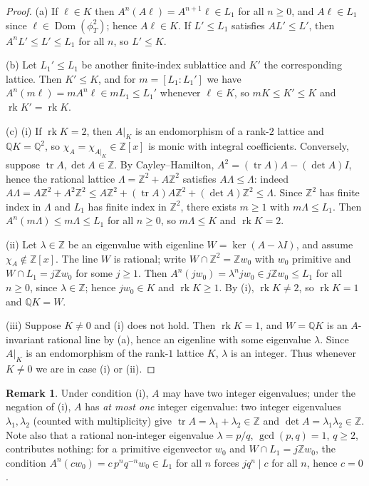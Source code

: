 \documentclass[12pt]{article}
\theoremstyle{definition}
\newtheorem{remark}{Remark}
\begin{document}
\begin{proof}
(a) If $\ell\in K$ then $A^n(A\ell)=A^{n+1}\ell\in L_1$ for all
$n\ge0$, and $A\ell\in L_1$ since $\ell\in\operatorname{Dom}(\phi_T^2)$;
hence $A\ell\in K$. If $L'\le L_1$ satisfies $AL'\le L'$, then
$A^nL'\le L'\le L_1$ for all $n$, so $L'\le K$.

(b) Let $L_1'\le L_1$ be another finite-index sublattice and $K'$ the
corresponding lattice. Then $K'\le K$, and for $m=[L_1:L_1']$ we have
$A^n(m\ell)=mA^n\ell\in mL_1\le L_1'$ whenever $\ell\in K$, so
$mK\le K'\le K$ and $\operatorname{rk}K'=\operatorname{rk}K$.

(c) (i) If $\operatorname{rk}K=2$, then $A|_K$ is an endomorphism of a
rank-$2$ lattice and $\mathbb{Q}K=\mathbb{Q}^2$, so
$\chi_A=\chi_{A|_K}\in\mathbb{Z}[x]$ is monic with integral
coefficients. Conversely, suppose
$\operatorname{tr}A,\det A\in\mathbb{Z}$. By Cayley--Hamilton,
$A^2=(\operatorname{tr}A)A-(\det A)I$, hence the rational lattice
$\Lambda=\mathbb{Z}^2+A\mathbb{Z}^2$ satisfies $A\Lambda\le\Lambda$:
indeed $A\Lambda=A\mathbb{Z}^2+A^2\mathbb{Z}^2\le
A\mathbb{Z}^2+(\operatorname{tr}A)A\mathbb{Z}^2+(\det A)\mathbb{Z}^2
\le\Lambda$. Since $\mathbb{Z}^2$ has finite index in $\Lambda$ and
$L_1$ has finite index in $\mathbb{Z}^2$, there exists $m\ge1$ with
$m\Lambda\le L_1$. Then $A^n(m\Lambda)\le m\Lambda\le L_1$ for all
$n\ge0$, so $m\Lambda\le K$ and $\operatorname{rk}K=2$.

(ii) Let $\lambda\in\mathbb{Z}$ be an eigenvalue with eigenline
$W=\ker(A-\lambda I)$, and assume $\chi_A\notin\mathbb{Z}[x]$. The line
$W$ is rational; write $W\cap\mathbb{Z}^2=\mathbb{Z}w_0$ with $w_0$
primitive and $W\cap L_1=j\mathbb{Z}w_0$ for some $j\ge1$. Then
$A^n(jw_0)=\lambda^njw_0\in j\mathbb{Z}w_0\le L_1$ for all $n\ge0$,
since $\lambda\in\mathbb{Z}$; hence $jw_0\in K$ and
$\operatorname{rk}K\ge1$. By (i), $\operatorname{rk}K\ne2$, so
$\operatorname{rk}K=1$ and $\mathbb{Q}K=W$.

(iii) Suppose $K\ne0$ and (i) does not hold. Then
$\operatorname{rk}K=1$, and $W=\mathbb{Q}K$ is an $A$-invariant rational
line by (a), hence an eigenline with some eigenvalue $\lambda$.
Since $A|_K$ is an endomorphism of the rank-$1$ lattice $K$, $\lambda$
is an integer. Thus whenever $K\ne0$ we are in case (i) or (ii).
\end{proof}

\begin{remark}
Under condition (i), $A$ may have two integer eigenvalues; under the
negation of (i), $A$ has \emph{at most one} integer eigenvalue: two
integer eigenvalues $\lambda_1,\lambda_2$ (counted with multiplicity)
give $\operatorname{tr}A=\lambda_1+\lambda_2\in\mathbb{Z}$ and
$\det A=\lambda_1\lambda_2\in\mathbb{Z}$. Note also that a rational
non-integer eigenvalue $\lambda=p/q$, $\gcd(p,q)=1$, $q\ge2$,
contributes nothing: for a primitive eigenvector $w_0$ and
$W\cap L_1=j\mathbb{Z}w_0$, the condition
$A^n(cw_0)=c\,p^nq^{-n}w_0\in L_1$ for all $n$ forces $jq^n\mid c$ for
all $n$, hence $c=0$.
\end{remark}
\end{document}
